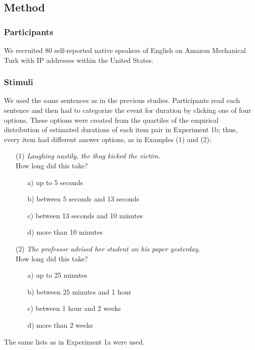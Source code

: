 \documentclass[preprint,12pt,authoryear]{elsarticle}
\begin{document}
\subsection{Method}\label{sec_methodurative massat}
\subsubsection{Participants} \label{sec_partCat}

We recruited 80 self-reported native speakers of English on Amazon Mechanical Turk with IP addresses within the United States.

\subsubsection{Stimuli}\label{sec_stimCat}
We used the same sentences as in the previous studies. Participants read each sentence and then had to categorize the event for duration by clicking one of four options. These options were created from the quartiles of the empirical distribution of estimated durations of each item pair in Experiment 1b; thus, every item had different answer options, as in Examples (1) and (2):

\begin{enumerate}
\item[(1)] \emph{Laughing nastily, the thug kicked the victim. }\\How long did this take?
\begin{itemize}
\item [a)] up to 5 seconds 
\item [b)] between 5 seconds  and 13 seconds
\item [c)] between 13 seconds  and 10 minutes 
\item [d)] more than 10 minutes 
\end{itemize}
\item[(2)] \emph{The professor advised her student on his paper yesterday. }\\How long did this take?
\begin{itemize}
\item [a)] up to 25 minutes
\item [b)] between 25 minutes and 1 hour
\item [c)] between 1 hour and 2 weeks
\item [d)] more than 2 weeks
\end{itemize}
\end{enumerate}

The same lists as in Experiment 1a were used.
\end{document}
